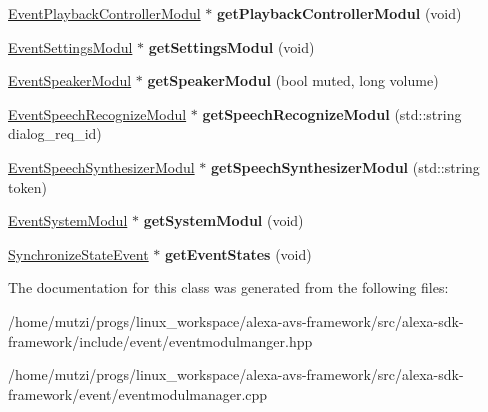 \begin{DoxyCompactItemize}
\hyperlink{classAlexaEvent_1_1EventPlaybackControllerModul}{Event\+Playback\+Controller\+Modul} $\ast$ {\bfseries get\+Playback\+Controller\+Modul} (void)
\item 
\mbox{\label{classAlexaEvent_1_1EventModulManager_afcfb1ec104cc49521b643c58d42fc4b9}} 
\hyperlink{classAlexaEvent_1_1EventSettingsModul}{Event\+Settings\+Modul} $\ast$ {\bfseries get\+Settings\+Modul} (void)
\item 
\mbox{\label{classAlexaEvent_1_1EventModulManager_a7cf38881437042620751b329d1015480}} 
\hyperlink{classAlexaEvent_1_1EventSpeakerModul}{Event\+Speaker\+Modul} $\ast$ {\bfseries get\+Speaker\+Modul} (bool muted, long volume)
\item 
\mbox{\label{classAlexaEvent_1_1EventModulManager_a8fcdb355e1e195404655b9d5c6e9763f}} 
\hyperlink{classAlexaEvent_1_1EventSpeechRecognizeModul}{Event\+Speech\+Recognize\+Modul} $\ast$ {\bfseries get\+Speech\+Recognize\+Modul} (std\+::string dialog\+\_\+req\+\_\+id)
\item 
\mbox{\label{classAlexaEvent_1_1EventModulManager_a512d8d05f520b7d0fd3408a01a5a3c8c}} 
\hyperlink{classAlexaEvent_1_1EventSpeechSynthesizerModul}{Event\+Speech\+Synthesizer\+Modul} $\ast$ {\bfseries get\+Speech\+Synthesizer\+Modul} (std\+::string token)
\item 
\mbox{\label{classAlexaEvent_1_1EventModulManager_a9562ecf26dbee7ce9e6ea347ee9d01a4}} 
\hyperlink{classAlexaEvent_1_1EventSystemModul}{Event\+System\+Modul} $\ast$ {\bfseries get\+System\+Modul} (void)
\item 
\mbox{\label{classAlexaEvent_1_1EventModulManager_aee946b159ab3dcc3583df0b1c39bd680}} 
\hyperlink{structAlexaEvent_1_1SynchronizeStateEvent}{Synchronize\+State\+Event} $\ast$ {\bfseries get\+Event\+States} (void)
\end{DoxyCompactItemize}


The documentation for this class was generated from the following files\+:\begin{DoxyCompactItemize}
\item 
/home/mutzi/progs/linux\+\_\+workspace/alexa-\/avs-\/framework/src/alexa-\/sdk-\/framework/include/event/eventmodulmanger.\+hpp\item 
/home/mutzi/progs/linux\+\_\+workspace/alexa-\/avs-\/framework/src/alexa-\/sdk-\/framework/event/eventmodulmanager.\+cpp\end{DoxyCompactItemize}
